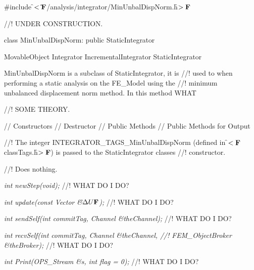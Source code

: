 
\indent \#include \f$<\tilde{ }{\bf F}$/analysis/integrator/MinUnbalDispNorm.h\f$>{\bf F}$

//! UNDER CONSTRUCTION.

\indent class MinUnbalDispNorm: public StaticIntegrator

\indent MovableObject
\indent\indent Integrator
\indent\indent\indent IncrementalIntegrator
\indent\indent\indent\indent StaticIntegrator
\indent\indent\indent\indent{}

\indent MinUnbalDispNorm is a subclass of StaticIntegrator, it is
//! used to when performing a static analysis on the FE\_Model using the
//! minimum unbalanced displacement norm method. In this method WHAT

//! SOME THEORY.

\indent // Constructors
\indent // Destructor
\indent // Public Methods
\indent // Public Methods for Output

//! The integer INTEGRATOR\_TAGS\_MinUnbalDispNorm (defined in
\f$<{\bf F}$classTags.h\f$>{\bf F}$) is passed to the StaticIntegrator classes
//! constructor. 


//! Does nothing.


{\em int newStep(void);}
//! WHAT DO I DO?

{\em int update(const Vector \&\f$\Delta U{\bf F}$);}
//! WHAT DO I DO?

{\em int sendSelf(int commitTag, Channel \&theChannel); } 
//! WHAT DO I DO?

{\em int recvSelf(int commitTag, Channel \&theChannel, 
//! FEM\_ObjectBroker \&theBroker); } 
//! WHAT DO I DO?

{\em int Print(OPS\_Stream \&s, int flag = 0);}
//! WHAT DO I DO?
